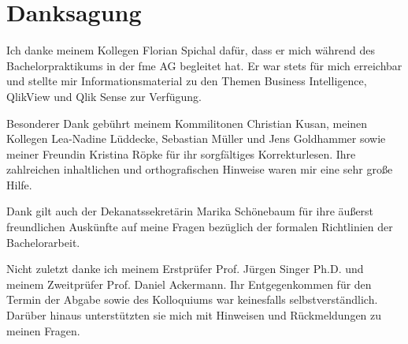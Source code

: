 \section*{Danksagung}

Ich danke meinem Kollegen Florian Spichal dafür, dass er mich während des Bachelor\-praktikums in der fme AG begleitet hat. Er war stets für mich erreichbar und stellte mir Informationsmaterial zu den Themen Business Intelligence, QlikView und Qlik Sense zur Verfügung.

Besonderer Dank gebührt meinem Kommilitonen Christian Kusan, meinen Kollegen Lea-Nadine Lüddecke, Sebastian Müller und Jens Goldhammer sowie meiner Freundin Kristina Röpke für ihr sorgfältiges Korrekturlesen. Ihre zahlreichen inhaltlichen und orthografischen Hinweise waren mir eine sehr große Hilfe.

Dank gilt auch der Dekanatssekretärin Marika Schönebaum für ihre äußerst freundlichen Auskünfte auf meine Fragen bezüglich der formalen Richtlinien der Bachelorarbeit.

Nicht zuletzt danke ich meinem Erstprüfer Prof. Jürgen Singer Ph.D. und meinem Zweitprüfer Prof. Daniel Ackermann. Ihr Entgegenkommen für den Termin der Abgabe sowie des Kolloquiums war keinesfalls selbstverständlich. Darüber hinaus unterstützten sie mich mit Hinweisen und Rückmeldungen zu meinen Fragen.

\newpage